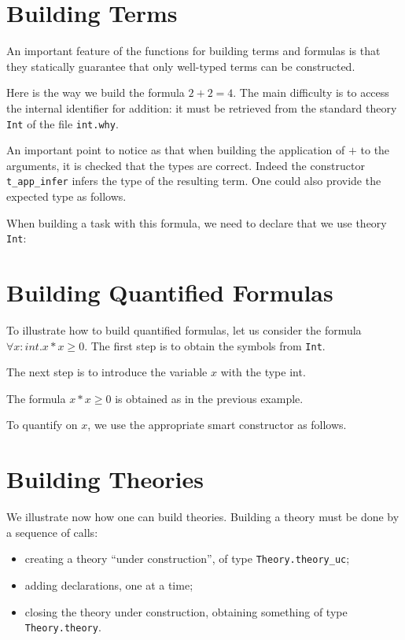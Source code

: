 \section{Building Terms}

An important feature of the functions for building terms and formulas
is that they statically guarantee that only well-typed terms can be
constructed.

Here is the way we build the formula $2+2=4$. The main difficulty is to
access the internal identifier for addition: it must be retrieved from
the standard theory \texttt{Int} of the file \texttt{int.why}.

An important point to notice as that when building the application of
$+$ to the arguments, it is checked that the types are correct. Indeed
the constructor \texttt{t\_app\_infer} infers the type of the resulting
term. One could also provide the expected type as follows.


When building a task with this formula, we need to declare that we use
theory \texttt{Int}:


\section{Building Quantified Formulas}

To illustrate how to build quantified formulas, let us consider
the formula $\forall x:int. x*x \geq 0$. The first step is to
obtain the symbols from \texttt{Int}.

The next step is to introduce the variable $x$ with the type int.

The formula $x*x \geq 0$ is obtained as in the previous example.

To quantify on $x$, we use the appropriate smart constructor as follows.


\section{Building Theories}

We illustrate now how one can build theories. Building a theory must
be done by a sequence of calls:
\begin{itemize}
\item creating a theory ``under construction'', of type \verb|Theory.theory_uc|;
\item adding declarations, one at a time;
\item closing the theory under construction, obtaining something of type \verb|Theory.theory|.
\end{itemize}

